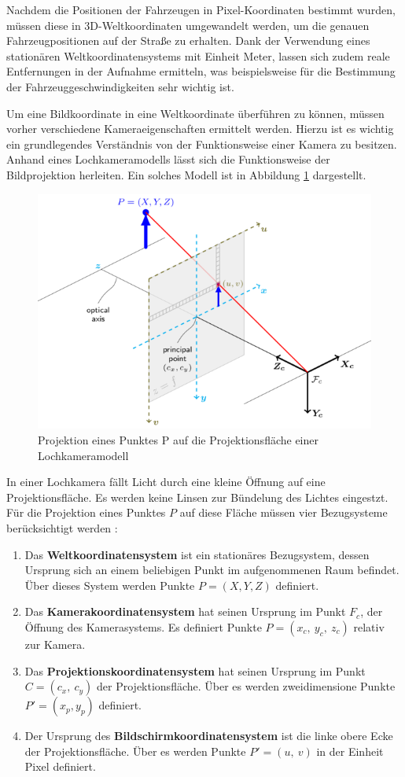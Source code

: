 Nachdem die Positionen der Fahrzeugen in Pixel-Koordinaten bestimmt wurden, müssen diese in 3D-Weltkoordinaten
umgewandelt werden, um die genauen Fahrzeugpositionen auf der Straße zu erhalten. Dank der Verwendung eines
stationären Weltkoordinatensystems mit Einheit Meter, lassen sich zudem reale Entfernungen
in der Aufnahme ermitteln, was beispielsweise für die Bestimmung der Fahrzeuggeschwindigkeiten sehr wichtig ist.

Um eine Bildkoordinate in eine Weltkoordinate überführen zu können, müssen vorher verschiedene Kameraeigenschaften
ermittelt werden. Hierzu ist es wichtig ein grundlegendes Verständnis von der Funktionsweise einer Kamera zu besitzen.
Anhand eines Lochkameramodells lässt sich die Funktionsweise der Bildprojektion herleiten.
Ein solches Modell ist in Abbildung \ref{fig:grund_pinhole_model} dargestellt.

\begin{figure}[H]
    \centering
    \includegraphics[width=0.55\linewidth]{resources/img/grundlagen/TrajectoryReconstruction/pinhole_camera_model}
    \caption[Bildprojektion im Lochkameramodell]{Projektion eines Punktes P auf die Projektionsfläche einer Lochkameramodell \cite[]{DevTeamOpenCV2018}}
    \label{fig:grund_pinhole_model}
\end{figure}

In einer Lochkamera fällt Licht durch eine kleine Öffnung auf eine Projektionsfläche. Es werden keine Linsen
zur Bündelung des Lichtes eingestzt. Für die Projektion eines Punktes $P$ auf diese Fläche müssen vier
Bezugsysteme berücksichtigt werden \cite[]{Jahne2012}:

\begin{enumerate}
    \item Das \textbf{Weltkoordinatensystem} ist ein stationäres Bezugsystem, dessen Ursprung sich an einem beliebigen Punkt
            im aufgenommenen Raum befindet. Über dieses System werden Punkte $P = (X, Y, Z)$ definiert.
    \item Das \textbf{Kamerakoordinatensystem} hat seinen Ursprung im Punkt $F_c$, der Öffnung des Kamerasystems.
            Es definiert Punkte $P = (x_c,\ y_c,\ z_c)$ relativ zur Kamera.
    \item Das \textbf{Projektionskoordinatensystem} hat seinen Ursprung im Punkt $C = (c_x,\ c_y)$ der Projektionsfläche.
            Über es werden zweidimensione Punkte $P' = (x_p, y_p)$ definiert.
    \item Der Ursprung des \textbf{Bildschirmkoordinatensystem} ist die linke obere Ecke der Projektionsfläche.
            Über es werden Punkte $P' = (u,\ v)$ in der Einheit Pixel definiert.
\end{enumerate}

